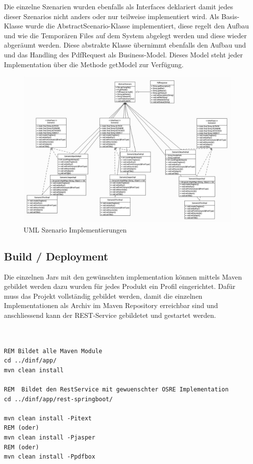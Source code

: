 \documentclass[main.tex]{subfiles}
\begin{document}
Die einzelne Szenarien wurden ebenfalls als Interfaces deklariert damit jedes dieser Szenarios nicht anders oder nur teilweise implementiert wird. Als Basis-Klasse wurde die AbstractScenario-Klasse implementiert, diese regelt den Aufbau und wie die Temporären Files auf dem System abgelegt werden und diese wieder abgeräumt werden. Diese abstrakte Klasse übernimmt ebenfalls den Aufbau und und das Handling des PdfRequest als Business-Model. Dieses Model steht jeder Implementation über die Methode getModel zur Verfügung.   

\begin{figure}[h]
\includegraphics[width=\textwidth ]{pic/uml/SzenarioImplementation.jpg}
 \caption{UML Szenario Implementierungen}
 \label{figure:szenImpl}
\end{figure}



\subsection{Build / Deployment}

Die einzelnen Jars mit den gewünschten implementation können mittels Maven gebildet werden dazu wurden für jedes Produkt ein Profil eingerichtet. Dafür muss das Projekt vollständig gebildet werden, damit die einzelnen Implementationen als Archiv im Maven Repository erreichbar sind und anschliessend kann der REST-Service gebildetet und gestartet werden.  

\begin{lstlisting}[language=command.com]


REM Bildet alle Maven Module 
cd ../dinf/app/ 
mvn clean install 

REM  Bildet den RestService mit gewuenschter OSRE Implementation     
cd ../dinf/app/rest-springboot/

mvn clean install -Pitext
REM (oder)
mvn clean install -Pjasper
REM (oder)
mvn clean install -Ppdfbox
\end{lstlisting}
\end{document}
